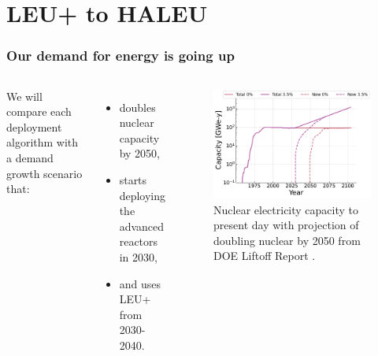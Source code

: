 \documentclass[9pt]{beamer}
\begin{document}
  \section{LEU+ to HALEU}

  \begin{frame}
    \frametitle{Our demand for energy is going up}
    \begin{columns}
        We will compare each deployment algorithm with a demand growth scenario that:
        \begin{itemize}[<+->]
          \item doubles nuclear capacity by 2050,
          \item starts deploying the advanced reactors in 2030,
          \item and uses LEU+ from 2030-2040.
        \end{itemize}
        \begin{figure}
          \centering
          \includegraphics[width=\textwidth]{../images/new_capacity_ng_d2.pdf}
          \caption{Nuclear electricity capacity to present day with projection of doubling nuclear by 2050 from DOE Liftoff Report \cite{julie_liftoff_pathways_2024}.}
        \end{figure}
    \end{columns}
  \end{frame}
\end{document}

